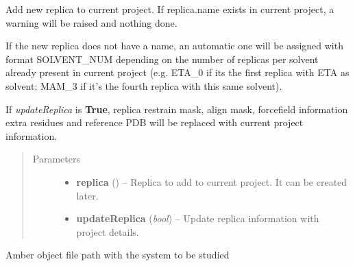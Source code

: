 \documentclass[letterpaper,10pt,english]{sphinxmanual}
\begin{document}
\begin{fulllineitems}
\begin{fulllineitems}
\begin{description}
\end{description}

\end{fulllineitems}


\begin{fulllineitems}
\label{project:pyMDMix.Project.Project.addNewReplica}
Add new replica to current project. If replica.name exists in current project,
a warning will be raised and nothing done.

If the new replica does not have a name, an automatic one will be assigned with format
SOLVENT\_NUM depending on the number of replicas per solvent already present in current project
(e.g. ETA\_0 if its the first replica with ETA as solvent; MAM\_3 if it's the fourth replica with this
same solvent).

If \emph{updateReplica} is \textbf{True}, replica restrain mask, align mask, forcefield information
extra residues and reference PDB will be replaced with current project information.
\begin{quote}\begin{description}
\item[{Parameters}] \leavevmode\begin{itemize}
\item {} 
\textbf{replica} ({\hyperref[replicas:pyMDMix.Replicas.Replica]{}}) -- Replica to add to current project. It can be created later.

\item {} 
\textbf{updateReplica} (\emph{bool}) -- Update replica information with project details.

\end{itemize}

\end{description}\end{quote}

\end{fulllineitems}


\begin{fulllineitems}
\label{project:pyMDMix.Project.Project.amberOFF}
Amber object file path with the system to be studied

\end{fulllineitems}


\end{fulllineitems}
\end{document}
